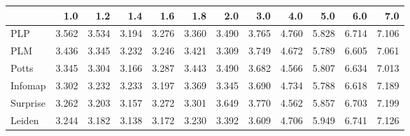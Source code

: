 \begin{tabular}{lrrrrrrrrrrr}
\toprule
{} &   1.0 &   1.2 &   1.4 &   1.6 &   1.8 &   2.0 &   3.0 &   4.0 &   5.0 &   6.0 &   7.0 \\
\midrule
PLP      & 3.562 & 3.534 & 3.194 & 3.276 & 3.360 & 3.490 & 3.765 & 4.760 & 5.828 & 6.714 & 7.106 \\
PLM      & 3.436 & 3.345 & 3.232 & 3.246 & 3.421 & 3.309 & 3.749 & 4.672 & 5.789 & 6.605 & 7.061 \\
Potts    & 3.345 & 3.304 & 3.166 & 3.287 & 3.443 & 3.490 & 3.682 & 4.566 & 5.807 & 6.634 & 7.013 \\
Infomap  & 3.302 & 3.232 & 3.233 & 3.197 & 3.369 & 3.345 & 3.690 & 4.734 & 5.788 & 6.618 & 7.189 \\
Surprise & 3.262 & 3.203 & 3.157 & 3.272 & 3.301 & 3.649 & 3.770 & 4.562 & 5.857 & 6.703 & 7.199 \\
Leiden   & 3.244 & 3.182 & 3.138 & 3.172 & 3.230 & 3.392 & 3.609 & 4.706 & 5.949 & 6.741 & 7.126 \\
\bottomrule
\end{tabular}
